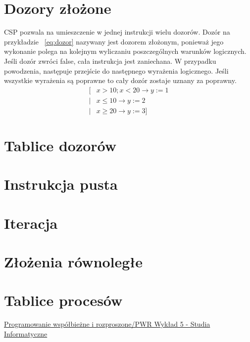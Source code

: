 \documentclass[a4paper]{report}
\begin{document}
  \section{Dozory złożone}
  CSP pozwala na umieszczenie w jednej instrukcji wielu dozorów.
  Dozór na przykładzie ~\ref{eq:dozor} nazywany jest dozorem złożonym, ponieważ jego wykonanie polega na kolejnym wyliczaniu poszczególnych warunków logicznych.
  Jeśli dozór zwróci false, cała instrukcja jest zaniechana.
  W przypadku powodzenia, następuje przejście do następnego wyrażenia logicznego.
  Jeśli wszystkie wyrażenia są poprawne to cały dozór zostaje uznany za poprawny.
  \begin{equation}
    \label{eq:dozor}
    \begin{split}
      \lbrack & x > 10; x < 20 \rightarrow y := 1\\
      | & x \leq 10 \rightarrow y := 2\\
      | & x \geq 20 \rightarrow y := 3 \rbrack
    \end{split}
  \end{equation}

  \section{Tablice dozorów}

  \section{Instrukcja pusta}

  \section{Iteracja}

  \section{Złożenia równoległe}

  \section{Tablice procesów}

  \begin{thebibliography}{9}
     \href{http://wazniak.mimuw.edu.pl/index.php?title=Programowanie\_wsp\%C3\%B3\%C5\%82bie\%C5\%BCne\_i\_rozproszone/PWR\_Wyk\%C5\%82ad\_5}{Programowanie współbieżne i rozproszone/PWR Wykład 5 - Studia Informatyczne}
  \end{thebibliography}
\end{document}
